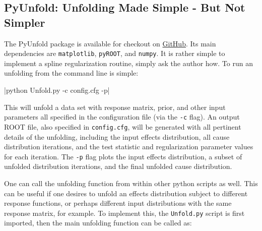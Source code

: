 


\subsection{PyUnfold: Unfolding Made Simple - But Not Simpler}
The PyUnfold package is available for checkout on \href{https://github.com/zhampel/PyUnfold}{GitHub}.
Its main dependencies are \verb|matplotlib|, \verb|pyROOT|, and \verb|numpy|.
It is rather simple to implement a spline regularization routine, simply ask the author how.
To run an unfolding from the command line is simple:

|python Unfold.py -c config.cfg -p|

This will unfold a data set with response matrix, prior, and other input parameters all specified in the configuration file (via the \verb|-c| flag).
An output ROOT \cite{root} file, also specified in \verb|config.cfg|, will be generated with all pertinent details of the unfolding, 
including the input effects distribution, all cause distribution iterations, and the test statistic and regularization parameter values for each iteration.
The \verb|-p| flag plots the input effects distribution, a subset of unfolded distribution iterations, and the final unfolded cause distribution.


One can call the unfolding function from within other python scripts as well.
This can be useful if one desires to unfold an effects distribution subject to different response functions,
or perhaps different input distributions with the same response matrix, for example. 
To implement this, the \verb|Unfold.py| script is first imported, then the main unfolding function can be called as:

